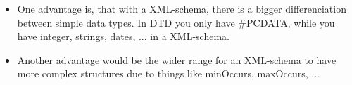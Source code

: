 \documentclass[12pt,ngerman]{scrartcl}
\begin{document}
\subexercise{}
{\footnotesize}

\subexercise{}
\begin{itemize}
    \item One advantage is, that with a XML-schema, there is a bigger differenciation between simple data types. In DTD you only have \#PCDATA, while you have integer, strings, dates, ... in a XML-schema.
    \item Another advantage would be the wider range for an XML-schema to have more complex structures due to things like minOccurs, maxOccurs, ...
\end{itemize}
\end{document}
